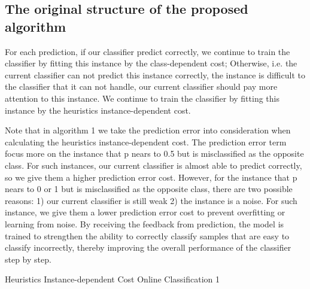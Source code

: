 \documentclass{article}
\begin{document}
\subsection{The original structure of the proposed algorithm}

For each prediction, if our classifier predict correctly, we continue to train the classifier by fitting this instance by the class-dependent cost; Otherwise, i.e. the current classifier can not predict this instance correctly, the instance is difficult to the classifier that it can not handle, our current classifier should pay more attention to this instance. We continue to train the classifier by fitting this instance by the heuristics instance-dependent cost.

Note that in algorithm 1 we take the prediction error into consideration when calculating the heuristics instance-dependent cost. The prediction error term focus more on the instance that p nears to 0.5 but is misclassified as the opposite class. For such instances, our current classifier is almost able to predict correctly, so we give them a higher prediction error cost. However, for the instance that p nears to 0 or 1 but is misclassified as the opposite class, there are two possible reasons: 1) our current classifier is still weak 2) the instance is a noise. For such instance, we give them a lower prediction error cost to prevent overfitting or learning from noise. By receiving the feedback from prediction, the model is trained to strengthen the ability to correctly classify samples that are easy to classify incorrectly, thereby improving the overall performance of the classifier step by step.


\begin{algorithm}
	\caption{Heuristics Instance-dependent Cost Online Classification 1}
\end{algorithm}
\end{document}
